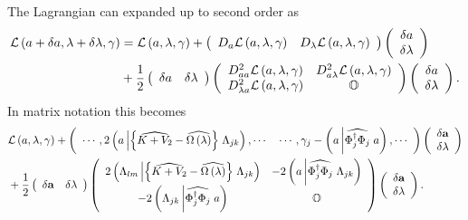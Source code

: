 \documentclass[aps,preprint]{revtex4}%
\begin{document}
The Lagrangian can expanded up to second order as
\begin{align}
\mathcal{L}\left(  a+\delta a,\lambda+\delta\lambda,\gamma\right)   &
=\mathcal{L}\left(  a,\lambda,\gamma\right)  +\left(
\begin{array}
[c]{cc}%
D_{a}\mathcal{L}\left(  a,\lambda,\gamma\right)  & D_{\lambda}\mathcal{L}%
\left(  a,\lambda,\gamma\right)
\end{array}
\right)  \left(
\begin{array}
[c]{c}%
\delta a\\
\delta\lambda
\end{array}
\right) \nonumber\\
&  +\frac{1}{2}\left(
\begin{array}
[c]{cc}%
\delta a & \delta\lambda
\end{array}
\right)  \left(
\begin{array}
[c]{cc}%
D_{aa}^{2}\mathcal{L}\left(  a,\lambda,\gamma\right)  & D_{a\lambda}%
^{2}\mathcal{L}\left(  a,\lambda,\gamma\right) \\
D_{\lambda a}^{2}\mathcal{L}\left(  a,\lambda,\gamma\right)  & \mathbb{O}%
\end{array}
\right)  \left(
\begin{array}
[c]{c}%
\delta a\\
\delta\lambda
\end{array}
\right)  .
\end{align}
In matrix notation this becomes
\begin{align}
&  \mathcal{L}\left(  a,\lambda,\gamma\right)  +\left(
\begin{array}
[c]{cc}%
\cdots,2\left(  a\left\vert \left\{  \widehat{K+V_{2}}-\widehat{\Omega\left(
\lambda\right)  }\right\}  \right.  \Lambda_{jk}\right)  ,\cdots &
\cdots,\gamma_{j}-\left(  a\left\vert \widehat{\Phi_{j}^{\dagger}\Phi_{j}%
}\right.  a\right)  ,\cdots
\end{array}
\right)  \left(
\begin{array}
[c]{c}%
\delta\mathbf{a}\\
\delta\mathbf{\lambda}%
\end{array}
\right) \nonumber\\
&  +\frac{1}{2}\left(
\begin{array}
[c]{cc}%
\delta\mathbf{a} & \delta\mathbf{\lambda}%
\end{array}
\right)  \left(
\begin{array}
[c]{cc}%
2\left(  \Lambda_{lm}\left\vert \left\{  \widehat{K+V_{2}}-\widehat{\Omega
\left(  \lambda\right)  }\right\}  \right.  \Lambda_{jk}\right)  & -2\left(
a\left\vert \widehat{\Phi_{j}^{\dagger}\Phi_{j}}\right.  \Lambda_{jk}\right)
\\
-2\left(  \Lambda_{jk}\left\vert \widehat{\Phi_{j}^{\dagger}\Phi_{j}}\right.
a\right)  & \mathbb{O}%
\end{array}
\right)  \left(
\begin{array}
[c]{c}%
\delta\mathbf{a}\\
\delta\mathbf{\lambda}%
\end{array}
\right)  .
\end{align}
\end{document}
